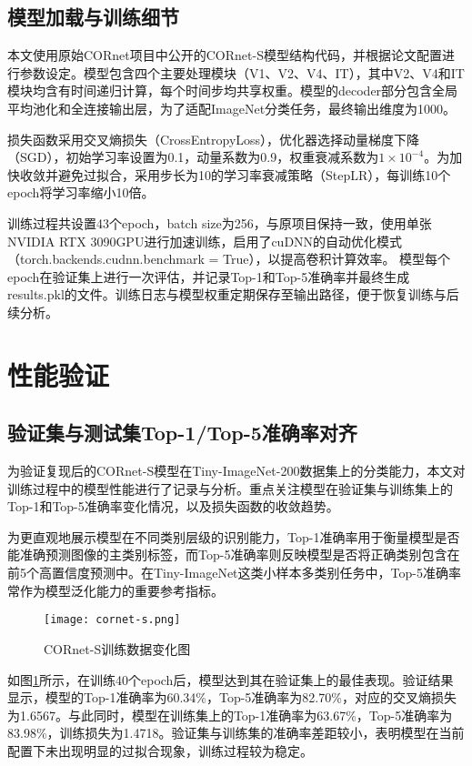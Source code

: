 \subsection{模型加载与训练细节}

本文使用原始CORnet项目中公开的CORnet-S模型结构代码，并根据论文配置进行参数设定。模型包含四个主要处理模块（V1、V2、V4、IT），其中V2、V4和IT模块均含有时间递归计算，每个时间步均共享权重。模型的decoder部分包含全局平均池化和全连接输出层，为了适配ImageNet分类任务，最终输出维度为1000。

损失函数采用交叉熵损失（CrossEntropyLoss），优化器选择动量梯度下降（SGD），初始学习率设置为0.1，动量系数为0.9，权重衰减系数为$1\times 10^{-4}$。为加快收敛并避免过拟合，采用步长为10的学习率衰减策略（StepLR），每训练10个epoch将学习率缩小10倍。

训练过程共设置43个epoch，batch size为256，与原项目保持一致，使用单张NVIDIA RTX 3090GPU进行加速训练，启用了cuDNN的自动优化模式（torch.backends.cudnn.benchmark = True），以提高卷积计算效率。
模型每个epoch在验证集上进行一次评估，并记录Top-1和Top-5准确率并最终生成results.pkl的文件。训练日志与模型权重定期保存至输出路径，便于恢复训练与后续分析。

\section{性能验证}

\subsection{验证集与测试集Top-1/Top-5准确率对齐}

为验证复现后的CORnet-S模型在Tiny-ImageNet-200数据集上的分类能力，本文对训练过程中的模型性能进行了记录与分析。重点关注模型在验证集与训练集上的Top-1和Top-5准确率变化情况，以及损失函数的收敛趋势。

为更直观地展示模型在不同类别层级的识别能力，Top-1准确率用于衡量模型是否能准确预测图像的主类别标签，而Top-5准确率则反映模型是否将正确类别包含在前5个高置信度预测中。在Tiny-ImageNet这类小样本多类别任务中，Top-5准确率常作为模型泛化能力的重要参考指标。

\begin{figure}[hbt]
	\centering
	\texttt{[image: cornet-s.png]}
	\caption{CORnet-S训练数据变化图}
	\label{f.szxt}
\end{figure}

如图\ref{f.szxt}所示，在训练40个epoch后，模型达到其在验证集上的最佳表现。验证结果显示，模型的Top-1准确率为60.34\%，Top-5准确率为82.70\%，对应的交叉熵损失为1.6567。与此同时，模型在训练集上的Top-1准确率为63.67\%，Top-5准确率为83.98\%，训练损失为1.4718。验证集与训练集的准确率差距较小，表明模型在当前配置下未出现明显的过拟合现象，训练过程较为稳定。

